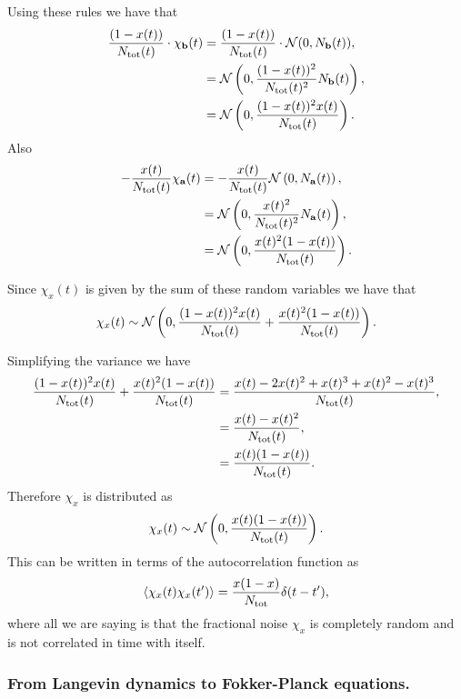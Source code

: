Using these rules we have that
\begin{align}
{(1 - x(t)) \over N_{\text{tot}}(t)} \cdot \chi_{\mathbf{b}}(t) &=
{(1 - x(t)) \over N_{\text{tot}}(t)} \cdot \mathcal{N}(0, N_{\mathbf{b}}(t)),\\
&= \mathcal{N}\left( 0, {(1 - x(t))^2 \over N_{\text{tot}}(t)^2} N_{\mathbf{b}}(t) \right),\\
&= \mathcal{N}\left( 0, {(1 - x(t))^2 x(t) \over N_{\text{tot}}(t)} \right).
\end{align}
Also
\begin{align}
  -{x(t) \over N_{\text{tot}}(t)} \chi_{\mathbf{a}}(t) &=
  -{x(t) \over N_{\text{tot}}(t)} \mathcal{N}\left( 0, N_{\mathbf{a}}(t) \right),\\
&= \mathcal{N}\left( 0, {x(t)^2 \over N_{\text{tot}}(t)^2} N_{\mathbf{a}}(t) \right),\\
&= \mathcal{N}\left( 0, {x(t)^2 (1 - x(t)) \over N_{\text{tot}}(t)} \right).
\end{align}

Since $\chi_x(t)$ is given by the sum of these random variables we have that
\begin{equation}
  \chi_x(t) \sim \mathcal{N}\left(0,  {(1 - x(t))^2 x(t) \over N_{\text{tot}}(t)} +
   {x(t)^2 (1 - x(t)) \over N_{\text{tot}}(t)} \right).
\end{equation}

Simplifying the variance we have
\begin{align}
  {(1 - x(t))^2 x(t) \over N_{\text{tot}}(t)} + {x(t)^2 (1 - x(t)) \over N_{\text{tot}}(t)} &=
  {x(t) - 2 x(t)^2 + x(t)^3 + x(t)^2 - x(t)^3 \over N_{\text{tot}}(t)},\\
  &= {x(t) - x(t)^2 \over N_{\text{tot}}(t)}, \\
  &= {x(t) (1 - x(t)) \over N_{\text{tot}}(t)}.
\end{align}
Therefore $\chi_x$ is distributed as
\begin{equation}
  \chi_x(t) \sim \mathcal{N} \left( 0, {x(t) (1 - x(t)) \over N_{\text{tot}}(t)}
  \right).
\end{equation}
This can be written in terms of the autocorrelation function as
\begin{equation}
  \left\langle \chi_x(t) \chi_x(t') \right\rangle = {x(1 - x) \over N_{\text{tot}}} \delta(t - t'),
\end{equation}
where all we are saying is that the fractional noise $\chi_x$ is completely
random and is not correlated in time with itself.

\subsubsection{From Langevin dynamics to Fokker-Planck equations.}

